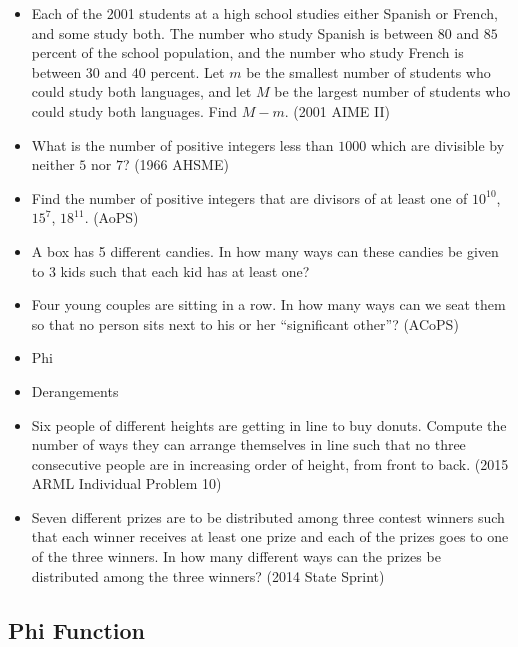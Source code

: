 \documentclass{article}
\begin{document}
\begin{itemize}
\item Each of the 2001 students at a high school studies either Spanish or French, and some study both. The number who study Spanish is between $80$ and $85$ percent of the school population, and the number who study French is between $30$ and $40$ percent. Let $m$ be the smallest number of students who could study both languages, and let $M$ be the largest number of students who could study both languages. Find $M-m$. (2001 AIME II)


\item What is the number of positive integers less than $1000$ which are divisible by neither $5$ nor $7$? (1966 AHSME)

\item Find the number of positive integers that are divisors of at least one of $10^{10}$, $15^{7}$, $18^{11}$. (AoPS)

\item A box has 5 different candies. In how many ways can these candies be given to 3 kids such that each kid has at least one?

\item Four young couples are sitting in a row. In how many ways can we seat them so that no person sits next to his or her ``significant other''? (ACoPS)

\item Phi

\item Derangements

\item Six people of different heights are getting in line to buy donuts. Compute the number of ways they can arrange themselves in line such that no three consecutive people are in increasing order of height, from front to back. (2015 ARML Individual Problem 10)

\item Seven different prizes are to be distributed among three contest winners such that each winner receives at least one prize and each of the prizes goes to one of the three winners. In how many different ways can the prizes be distributed among the three winners? (2014 State Sprint)


\end{itemize}

\subsection{Phi Function}
\end{document}
